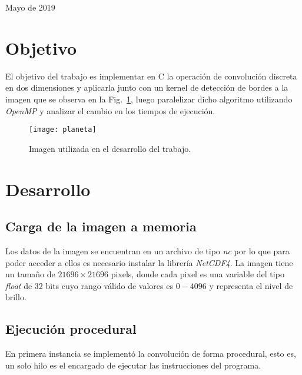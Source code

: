 \documentclass[12pt]{article}
\begin{document}
\begin{titlepage}

{\large Mayo de 2019}\\[2cm] %

\vfill %

\end{titlepage}

\section{Objetivo}
El objetivo del trabajo es implementar en C la operaci\'on de convoluci\'on discreta
en dos dimensiones y aplicarla junto con un kernel de detecci\'on de bordes a la
imagen que se observa en la Fig.~\ref{mundo}, luego paralelizar dicho algoritmo
utilizando \textit{OpenMP} y analizar el cambio en los tiempos de ejecuci\'on.

\begin{figure}[H]
\centering
\texttt{[image: planeta]}
\caption{Imagen utilizada en el desarrollo del trabajo.}\label{mundo}
\end{figure}

\section{Desarrollo}
\subsection{Carga de la imagen a memoria}
Los datos de la imagen se encuentran en un archivo de tipo \textit{nc} por lo
que para poder acceder a ellos es necesario instalar la librer\'ia
\textit{NetCDF4}. La imagen tiene un tamaño de $21696\times21696$ pixels, donde
cada pixel es una variable del tipo \textit{float} de 32 bits cuyo rango
v\'alido de valores es $0 - 4096$ y representa el nivel de brillo.

\subsection{Ejecuci\'on procedural}
En primera instancia se implement\'o la convoluci\'on de forma procedural, esto
es, un solo hilo es el encargado de ejecutar las instrucciones del programa.
\end{document}
